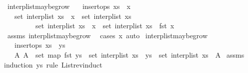 \begin{isabellebody}
%
\endisadelimproof
\isanewline
{}\isamarkupfalse%
\ interp{\isacharunderscore}list{\isacharunderscore}maybe{\isacharunderscore}grow{}{\isacharcolon}\isanewline
\ \ \ {\isachardoublequoteopen}insert{\isacharunderscore}ops\ {\isacharparenleft}xs\ {\isacharat}\ {\isacharbrackleft}x{\isacharbrackright}{\isacharparenright}{\isachardoublequoteclose}\isanewline
\ \ \ {\isachardoublequoteopen}set\ {\isacharparenleft}interp{\isacharunderscore}list\ {\isacharparenleft}xs\ {\isacharat}\ {\isacharbrackleft}x{\isacharbrackright}{\isacharparenright}{\isacharparenright}\ {\isacharequal}\ set\ {\isacharparenleft}interp{\isacharunderscore}list\ xs{\isacharparenright}\ {\isasymor}\isanewline
\ \ \ \ \ \ \ \ \ set\ {\isacharparenleft}interp{\isacharunderscore}list\ {\isacharparenleft}xs\ {\isacharat}\ {\isacharbrackleft}x{\isacharbrackright}{\isacharparenright}{\isacharparenright}\ {\isacharequal}\ {\isacharparenleft}set\ {\isacharparenleft}interp{\isacharunderscore}list\ xs{\isacharparenright}\ {\isasymunion}\ {\isacharbraceleft}fst\ x{\isacharbraceright}{\isacharparenright}{\isachardoublequoteclose}\isanewline
%
\isadelimproof
%
\endisadelimproof
%
\isatagproof
{}\isamarkupfalse%
\ assms\ interp{\isacharunderscore}list{\isacharunderscore}maybe{\isacharunderscore}grow\ \isamarkupfalse%
\ {\isacharparenleft}cases\ x{\isacharcomma}\ auto{\isacharparenright}%
\endisatagproof
{\isafoldproof}%
%
\isadelimproof
\isanewline
%
\endisadelimproof
\isanewline
{}\isamarkupfalse%
\ interp{\isacharunderscore}list{\isacharunderscore}maybe{\isacharunderscore}grow{}{\isacharcolon}\isanewline
\ \ \ {\isachardoublequoteopen}insert{\isacharunderscore}ops\ {\isacharparenleft}xs\ {\isacharat}\ ys{\isacharparenright}{\isachardoublequoteclose}\isanewline
\ \ \ {\isachardoublequoteopen}{\isasymexists}A{\isachardot}\ A\ {\isasymsubseteq}\ set\ {\isacharparenleft}map\ fst\ ys{\isacharparenright}\ {\isasymand}\ set\ {\isacharparenleft}interp{\isacharunderscore}list\ {\isacharparenleft}xs\ {\isacharat}\ ys{\isacharparenright}{\isacharparenright}\ {\isacharequal}\ set\ {\isacharparenleft}interp{\isacharunderscore}list\ xs{\isacharparenright}\ {\isasymunion}\ A{\isachardoublequoteclose}\isanewline
%
\isadelimproof
%
\endisadelimproof
%
\isatagproof
{}\isamarkupfalse%
\ assms\ \isamarkupfalse%
{\isacharparenleft}induction\ ys\ rule{\isacharcolon}\ List{\isachardot}rev{\isacharunderscore}induct{\isacharparenright}\isanewline

\end{isabellebody}
